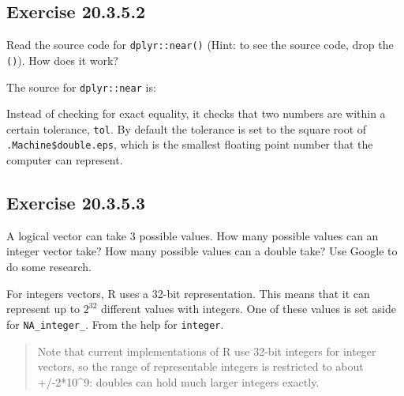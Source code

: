 \documentclass[]{book}
\newenvironment{Shaded}{\begin{snugshade}}{\end{snugshade}}
\newcommand{\CommentTok}[1]{\textcolor[rgb]{0.56,0.35,0.01}{\textit{#1}}}
\newcommand{\NormalTok}[1]{#1}
\newcommand{\OperatorTok}[1]{\textcolor[rgb]{0.81,0.36,0.00}{\textbf{#1}}}
\theoremstyle{plain}
\theoremstyle{remark}
\begin{document}
\hypertarget{exercise-20.3.5.2}{%
\subsection*{\texorpdfstring{Exercise
{20.3.5.2}}{Exercise 20.3.5.2}}\label{exercise-20.3.5.2}}

Read the source code for \texttt{dplyr::near()} (Hint: to see the source
code, drop the \texttt{()}). How does it work?

The source for \texttt{dplyr::near} is:

\begin{Shaded}
\end{Shaded}

Instead of checking for exact equality, it checks that two numbers are
within a certain tolerance, \texttt{tol}. By default the tolerance is
set to the square root of \texttt{.Machine\$double.eps}, which is the
smallest floating point number that the computer can represent.

\hypertarget{exercise-20.3.5.3}{%
\subsection*{\texorpdfstring{Exercise
{20.3.5.3}}{Exercise 20.3.5.3}}\label{exercise-20.3.5.3}}

A logical vector can take 3 possible values. How many possible values
can an integer vector take? How many possible values can a double take?
Use Google to do some research.

For integers vectors, R uses a 32-bit representation. This means that it
can represent up to \(2^{32}\) different values with integers. One of
these values is set aside for \texttt{NA\_integer\_}. From the help for
\texttt{integer}.

\begin{quote}
Note that current implementations of R use 32-bit integers for integer
vectors, so the range of representable integers is restricted to about
+/-2*10\^{}9: doubles can hold much larger integers exactly.
\end{quote}
\end{document}
